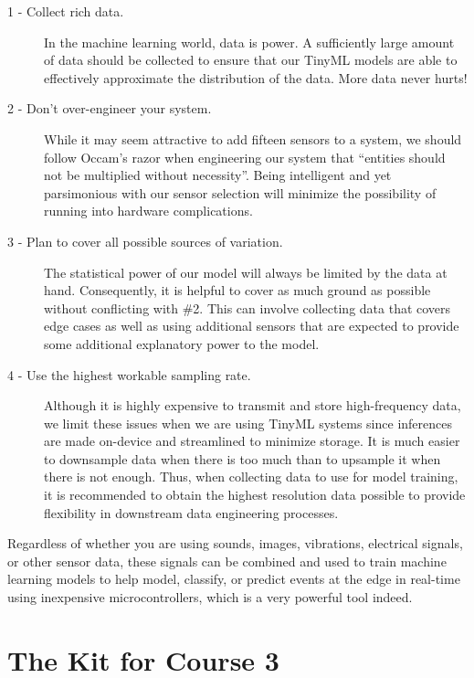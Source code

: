 \begin{description}
  \item[1 - Collect rich data.] In the machine learning world, data is power. A sufficiently large amount of data should be collected to ensure that our TinyML models are able to effectively approximate the distribution of the data. More data never hurts!

  \item[2 - Don't over-engineer your system.] While it may seem attractive to add fifteen sensors to a system, we should follow Occam’s razor when engineering our system that “entities should not be multiplied without necessity”. Being intelligent and yet parsimonious with our sensor selection will minimize the possibility of running into hardware complications.

  \item[3 - Plan to cover all possible sources of variation.] The statistical power of our model will always be limited by the data at hand. Consequently, it is helpful to cover as much ground as possible without conflicting with \#2. This can involve collecting data that covers edge cases as well as using additional sensors that are expected to provide some additional explanatory power to the model.

  \item[4 - Use the highest workable sampling rate.] Although it is highly expensive to transmit and store high-frequency data, we limit these issues when we are using TinyML systems since inferences are made on-device and streamlined to minimize storage. It is much easier to downsample data when there is too much than to upsample it when there is not enough. Thus, when collecting data to use for model training, it is recommended to obtain the highest resolution data possible to provide flexibility in downstream data engineering processes.
\end{description}

Regardless of whether you are using sounds, images, vibrations, electrical signals, or other sensor data, these signals can be combined and used to train machine learning models to help model, classify, or predict events at the edge in real-time using inexpensive microcontrollers, which is a very powerful tool indeed.

\section{The Kit for Course 3}

